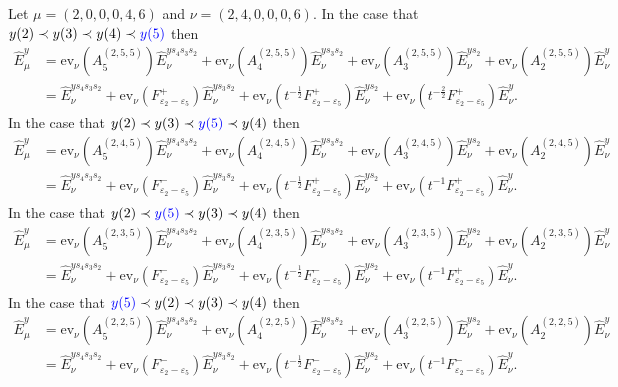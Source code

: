 \documentclass[11pt]{article}
\theoremstyle{plain}
\theoremstyle{definition}
\newenvironment{example}
  {\pushQED{\qed}\exampleinner}
  {\popQED\endexampleinner}
\theoremstyle{remark}
\numberwithin{equation}{section}
\def\ev{\mathrm{ev}}
\newcounter{r}
\newcounter{s}
\begin{document}
\begin{example} \label{0gapexample}
Let $\mu = (2, 0, 0, 0,4,6)$ 
and $\nu = (2,4,0,0,0,6)$. \hfil\break
In the case that $y(2)\prec y(3)\prec y(4)\prec {\color{blue} y(5)}$ then
\begin{align*}
\widehat{E}^y_\mu 
&=  \ev_\nu(A^{(2,5,5)}_5)\widehat{E}^{ys_4s_3s_2}_\nu
+ \ev_\nu(A^{(2,5,5)}_4) \widehat{E}^{ys_3s_2}_\nu
+ \ev_\nu(A^{(2,5,5)}_3)\widehat{E}^{ys_2}_\nu 
+ \ev_\nu(A^{(2,5,5)}_2)\widehat{E}^{y}_\nu \\
&= \widehat{E}^{ys_4s_3s_2}_\nu
+ \ev_\nu(F^+_{\varepsilon_2-\varepsilon_5}) \widehat{E}^{ys_3s_2}_\nu
+ \ev_\nu(t^{-\frac12} F^+_{\varepsilon_2-\varepsilon_5})\widehat{E}^{ys_2}_\nu 
+ \ev_\nu(t^{-\frac22}F^+_{\varepsilon_2-\varepsilon_5} )\widehat{E}^{y}_\nu.
\end{align*}
In the case that $y(2)\prec y(3)\prec {\color{blue}y(5)} \prec y(4)$ then
\begin{align*}
\widehat{E}^y_\mu 
&=  \ev_\nu(A^{(2,4,5)}_5)\widehat{E}^{ys_4s_3s_2}_\nu
+ \ev_\nu(A^{(2,4,5)}_4) \widehat{E}^{ys_3s_2}_\nu
+ \ev_\nu(A^{(2,4,5)}_3)\widehat{E}^{ys_2}_\nu 
+ \ev_\nu(A^{(2,4,5)}_2)\widehat{E}^{y}_\nu \\
&= \widehat{E}^{ys_4s_3s_2}_\nu
+ \ev_\nu(F^-_{\varepsilon_2-\varepsilon_5}) \widehat{E}^{ys_3s_2}_\nu
+ \ev_\nu( t^{-\frac12}F^+_{\varepsilon_2-\varepsilon_5} )\widehat{E}^{ys_2}_\nu 
+ \ev_\nu( t^{-1}F^+_{\varepsilon_2-\varepsilon_5} )\widehat{E}^{y}_\nu.
\end{align*}
In the case that $y(2)\prec {\color{blue} y(5)}\prec y(3)\prec y(4)$ then
\begin{align*}
\widehat{E}^y_\mu 
&=  \ev_\nu(A^{(2,3,5)}_5)\widehat{E}^{ys_4s_3s_2}_\nu
+ \ev_\nu(A^{(2,3,5)}_4) \widehat{E}^{ys_3s_2}_\nu
+ \ev_\nu(A^{(2,3,5)}_3)\widehat{E}^{ys_2}_\nu 
+ \ev_\nu(A^{(2,3,5)}_2)\widehat{E}^{y}_\nu \\
&= \widehat{E}^{ys_4s_3s_2}_\nu
+ \ev_\nu(F^-_{\varepsilon_2-\varepsilon_5}) \widehat{E}^{ys_3s_2}_\nu
+ \ev_\nu(t^{-\frac12}F^-_{\varepsilon_2-\varepsilon_5})\widehat{E}^{ys_2}_\nu 
+ \ev_\nu( t^{-1}F^+_{\varepsilon_2-\varepsilon_5} )\widehat{E}^{y}_\nu.
\end{align*}
In the case that ${\color{blue} y(5)} \prec y(2) \prec y(3) \prec y(4)$ then
\begin{align*}
\widehat{E}^y_\mu 
&=  \ev_\nu(A^{(2,2,5)}_5)\widehat{E}^{ys_4s_3s_2}_\nu
+ \ev_\nu(A^{(2,2,5)}_4) \widehat{E}^{ys_3s_2}_\nu
+ \ev_\nu(A^{(2,2,5)}_3)\widehat{E}^{ys_2}_\nu 
+ \ev_\nu(A^{(2,2,5)}_2)\widehat{E}^{y}_\nu \\
&= \widehat{E}^{ys_4s_3s_2}_\nu
+ \ev_\nu(F^-_{\varepsilon_2-\varepsilon_5}) \widehat{E}^{ys_3s_2}_\nu
+ \ev_\nu(t^{-\frac12}F^-_{\varepsilon_2-\varepsilon_5})\widehat{E}^{ys_2}_\nu 
+ \ev_\nu( t^{-1}F^-_{\varepsilon_2-\varepsilon_5} )\widehat{E}^{y}_\nu.
\end{align*}
\end{example}
\end{document}
